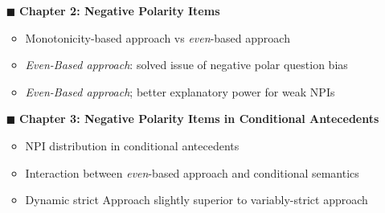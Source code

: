 \begin{frame}[t]
	\sectionpage\vskip 9pt
	\begin{itemize}
		\item[$\blacksquare$]	\textbf{Chapter 2: Negative Polarity Items}\vskip 4.5pt
            \begin{itemize}
                \item<2-> Monotonicity-based approach vs \textit{even}-based approach\vskip 4.5pt
                \item<2-> \textit{Even-Based approach}: solved issue of negative polar question bias\vskip 4.5pt
                \item<2-> \textit{Even-Based approach}; better explanatory power for weak NPIs\vskip 9pt
            \end{itemize}
        \item[$\blacksquare$]	\textbf{Chapter 3: Negative Polarity Items in Conditional Antecedents}\vskip 4.5pt
            \begin{itemize}
                \item<3-> NPI distribution in conditional antecedents\vskip 4.5pt
                \item<3-> Interaction between \textit{even}-based approach and conditional semantics\vskip 4.5pt
                \item<3-> Dynamic strict Approach slightly superior to variably-strict approach
            \end{itemize}
	\end{itemize}
\end{frame}

